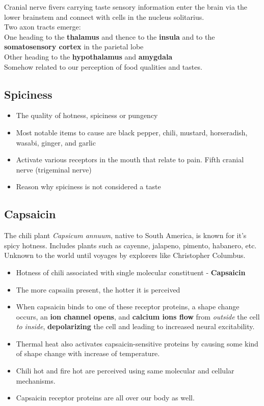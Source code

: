 \documentclass{article}
\begin{document}
Cranial nerve fivers carrying taste sensory information enter the brain via the lower brainstem and connect with cells in the nucleus solitarius. \\
Two axon tracts emerge: \\
\indent One heading to the \textbf{thalamus} and thence to the \textbf{insula} and to the \textbf{somatosensory cortex} in the parietal lobe \\
\indent Other heading to the \textbf{hypothalamus} and \textbf{amygdala} \\
Somehow related to our perception of food qualities and tastes. \\

\subsection{Spiciness}

\begin{itemize}
    \item The quality of hotness, spiciness or pungency
    \item Most notable items to cause are black pepper, chili, mustard, horseradish, wasabi, ginger, and garlic
    \item Activate various receptors in the mouth that relate to pain. Fifth cranial nerve (trigeminal nerve)
    \item Reason why spiciness is not considered a taste
\end{itemize}

\subsection{Capsaicin}

The chili plant \textit{Capsicum annuum}, native to South America, is known for it's spicy hotness. Includes plants such as cayenne, jalapeno, pimento, habanero, etc. Unknown to the world until voyages by explorers like Christopher Columbus. 

\begin{itemize}
  \item Hotness of chili associated with single molecular constituent - \textbf{Capsaicin}
  \item The more capsaiin present, the hotter it is perceived
  \item When capsaicin binds to one of these receptor proteins, a shape change occurs, an \textbf{ion channel opens}, and \textbf{calcium ions flow} from \textit{outside} the cell \textit{to inside}, \textbf{depolarizing} the cell and leading to increased neural excitability. 
  \item Thermal heat also activates capsaicin-sensitive proteins by causing some kind of shape change with increase of temperature. 
  \item Chili hot and fire hot are perceived using same molecular and cellular mechanisms. 
  \item Capsaicin receptor proteins are all over our body as well. 
\end{itemize}
\end{document}
